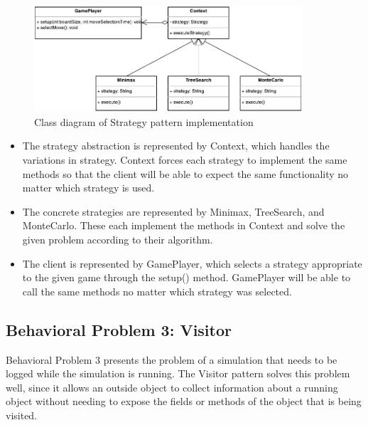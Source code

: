 \documentclass[11pt]{article}
\begin{document}
\begin{figure}[!htb]
  \begin{center}
    \includegraphics[width=100mm]{Strategy.pdf}
    \caption{Class diagram of Strategy pattern implementation}
    \label{fig:strategy}
  \end{center} 
\end{figure}

\begin{itemize}
\item The strategy abstraction is represented by {\ttfamily Context}, which 
  handles the variations in strategy. {\ttfamily Context} forces each strategy
  to implement the same methods so that the client will be able to expect the
  same functionality no matter which strategy is used.
\item The concrete strategies are represented by {\ttfamily Minimax}, 
  {\ttfamily TreeSearch}, and {\ttfamily MonteCarlo}. These each implement the
  methods in {\ttfamily Context} and solve the given problem according to their
  algorithm.
\item The client is represented by {\ttfamily GamePlayer}, which selects a 
  strategy appropriate to the given game through the {\ttfamily setup()} method. 
  {\ttfamily GamePlayer} will be able to call the same methods no matter which 
  strategy was selected.
\end{itemize}

\newpage
\subsection{Behavioral Problem 3: Visitor}

Behavioral Problem 3 presents the problem of a simulation that needs to be 
logged while the simulation is running. The Visitor pattern solves this problem
well, since it allows an outside object to collect information about a running
object without needing to expose the fields or methods of the object that is 
being visited.
\end{document}
